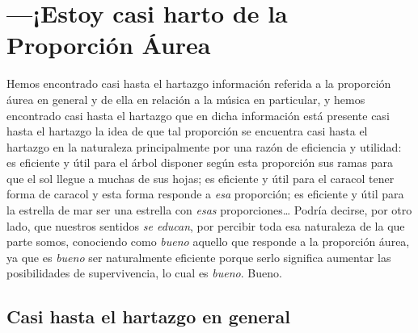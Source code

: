 \chapter {---¡Estoy casi harto de la Proporción Áurea}
Hemos encontrado casi hasta el hartazgo información referida a la proporción áurea en general y de ella en relación a la música en particular, y hemos encontrado casi hasta el hartazgo que en dicha información está presente casi hasta el hartazgo la idea de que tal proporción se encuentra casi hasta el hartazgo en la naturaleza principalmente por una razón de eficiencia y utilidad: es eficiente y útil para el árbol disponer según esta proporción sus ramas para que el sol llegue a muchas de sus hojas; es eficiente y útil para el caracol tener forma de caracol y esta forma responde a \emph{esa} proporción; es eficiente y útil para la estrella de mar ser una estrella con \emph{esas} proporciones\ldots
Podría decirse, por otro lado, que nuestros sentidos \emph{se educan}, por percibir toda esa naturaleza de la que parte somos, conociendo como \emph{bueno} aquello que responde a la proporción áurea, ya que es \emph{bueno} ser naturalmente eficiente porque serlo significa aumentar las posibilidades de supervivencia, lo cual es \emph{bueno}. Bueno.


\section{Casi hasta el hartazgo en general}

